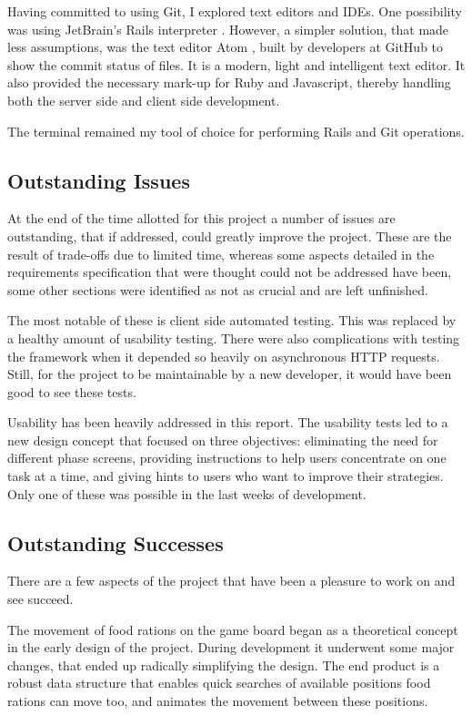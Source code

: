Having committed to using Git, I explored text editors and IDEs. One possibility was using JetBrain's Rails interpreter \cite{JetBrains}. However, a simpler solution, that made less assumptions, was the text editor Atom \cite{Atom}, built by developers at GitHub to show the commit status of files. It is a modern, light and intelligent text editor. It also provided the necessary mark-up for Ruby and Javascript, thereby handling both the server side and client side development.

The terminal remained my tool of choice for performing Rails and Git operations.

\subsection{Outstanding Issues}
At the end of the time allotted for this project a number of issues are outstanding, that if addressed, could greatly improve the project. These are the result of trade-offs due to limited time, whereas some aspects detailed in the requirements specification that were thought could not be addressed have been, some other sections were identified as not as crucial and are left unfinished.

The most notable of these is client side automated testing. This was replaced by a healthy amount of usability testing. There were also complications with testing the framework when it depended so heavily on asynchronous HTTP requests. Still, for the project to be maintainable by a new developer, it would have been good to see these tests.

Usability has been heavily addressed in this report. The usability tests led to a new design concept that focused on three objectives: eliminating the need for different phase screens, providing instructions to help users concentrate on one task at a time, and giving hints to users who want to improve their strategies. Only one of these was possible in the last weeks of development.

\subsection{Outstanding Successes}
There are a few aspects of the project that have been a pleasure to work on and see succeed.

The movement of food rations on the game board began as a theoretical concept in the early design of the project. During development it underwent some major changes, that ended up radically simplifying the design. The end product is a robust data structure that enables quick searches of available positions food rations can move too, and animates the movement between these positions.

